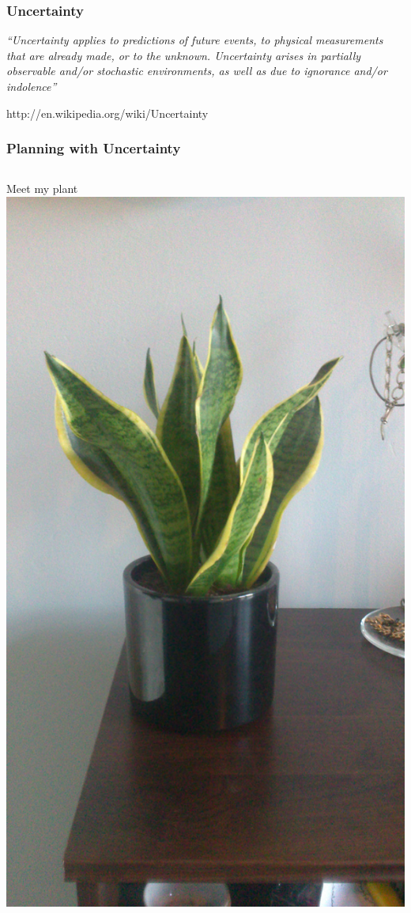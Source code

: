 \documentclass{beamer}
\let\origframetitle=\frametitle
\renewcommand\frametitle[1]{\origframetitle{\textbf{\large{\textrm{#1}}}}}
\begin{document}
\begin{frame}
  \frametitle{Uncertainty}

  \emph{``Uncertainty applies to predictions of future events, to physical
  measurements that are already made, or to the unknown. Uncertainty arises in
  partially observable and/or stochastic environments, as well as due to
  ignorance and/or indolence''}

  \vspace{2cm}

  \tiny{http://en.wikipedia.org/wiki/Uncertainty}

\end{frame}


\begin{frame}
  \frametitle{Planning with Uncertainty}

  \begin{columns}
     {Meet my plant}
    \includegraphics[width=\textwidth]{images/plant.jpg}


\end{columns}
\end{frame}
\end{document}
